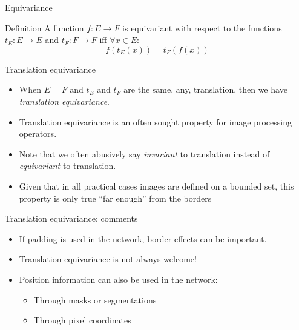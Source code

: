 \documentclass[xcolor=pdftex,dvipsnames,table,mathserif]{beamer}
\begin{document}
\begin{frame}{Equivariance}

\begin{block}{Definition}
  A function $f: E \longrightarrow F$ is \alert{equivariant} with respect to the functions $t_E: E \longrightarrow E$ and $t_F: F \longrightarrow F$ iff $\forall x \in E$:
  \[
  f(t_E(x)) = t_F(f(x))
  \]
\end{block}

\end{frame}

\begin{frame}{Translation equivariance}

\begin{itemize}
  \item When $E=F$ and $t_E$ and $t_F$ are the same, any, translation, then we have \emph{translation equivariance}.
\item Translation equivariance is an often sought property for image processing operators.
\item Note that we often abusively say \emph{invariant} to translation instead of \emph{equivariant} to translation.
\item Given that in all practical cases images are defined on a bounded set, this property is only true ``far enough'' from the borders
\end{itemize}

\end{frame}




\begin{frame}{Translation equivariance: comments}



  \begin{itemize}[<+->]
  \item If padding is used in the network, border effects can be important.
  \item Translation equivariance is not always welcome!
  \item Position information can also be used in the network:
    \begin{itemize}
    \item Through masks or segmentations
    \item Through pixel coordinates
    \end{itemize}
  \end{itemize}

\end{frame}
\end{document}
